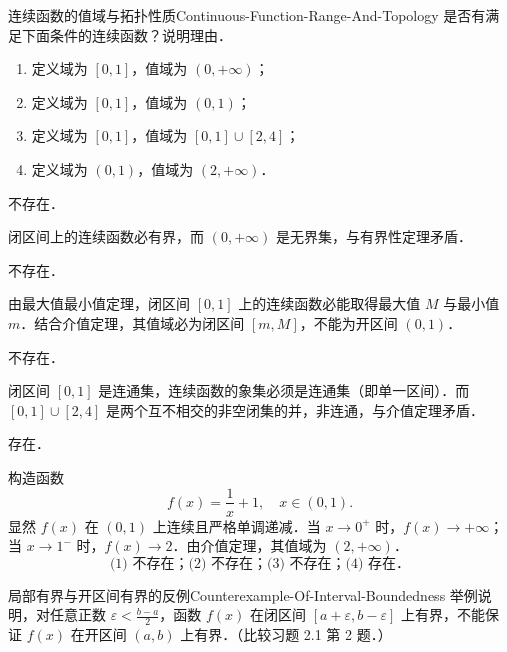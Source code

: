 \begin{problem}{连续函数的值域与拓扑性质}{Continuous-Function-Range-And-Topology}
    是否有满足下面条件的连续函数？说明理由．
    \begin{enumerate}
        \item 定义域为 $[0, 1]$，值域为 $(0, +\infty)$；
        \item 定义域为 $[0, 1]$，值域为 $(0, 1)$；
        \item 定义域为 $[0, 1]$，值域为 $[0, 1] \cup [2, 4]$；
        \item 定义域为 $(0, 1)$，值域为 $(2, +\infty)$．
    \end{enumerate}
\end{problem}

\begin{solution}
     不存在．

    闭区间上的连续函数必有界，而 $(0, +\infty)$ 是无界集，与有界性定理矛盾．

     不存在．

    由最大值最小值定理，闭区间 $[0, 1]$ 上的连续函数必能取得最大值 $M$ 与最小值 $m$．结合介值定理，其值域必为闭区间 $[m, M]$，不能为开区间 $(0, 1)$．

     不存在．

    闭区间 $[0, 1]$ 是连通集，连续函数的象集必须是连通集（即单一区间）．而 $[0, 1] \cup [2, 4]$ 是两个互不相交的非空闭集的并，非连通，与介值定理矛盾．

     存在．

    构造函数
    \begin{equation}
        f(x) = \frac{1}{x} + 1, \quad x \in (0, 1).
    \end{equation}
    显然 $f(x)$ 在 $(0, 1)$ 上连续且严格单调递减．当 $x \to 0^+$ 时，$f(x) \to +\infty$；当 $x \to 1^-$ 时，$f(x) \to 2$．由介值定理，其值域为 $(2, +\infty)$．
    \begin{equation}
        \boxed{\text{(1) 不存在；(2) 不存在；(3) 不存在；(4) 存在．}}
    \end{equation}
\end{solution}

\begin{problem}{局部有界与开区间有界的反例}{Counterexample-Of-Interval-Boundedness}
    举例说明，对任意正数 $\varepsilon < \frac{b-a}{2}$，函数 $f(x)$ 在闭区间 $[a + \varepsilon, b - \varepsilon]$ 上有界，不能保证 $f(x)$ 在开区间 $(a, b)$ 上有界．（比较习题 2.1 第 2 题．）
\end{problem}

